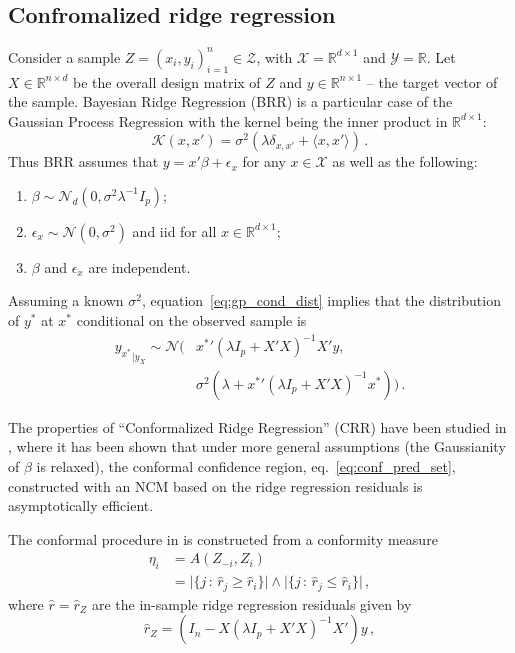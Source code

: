 \documentclass[a4paper,14pt]{extarticle}
\newcommand{\Ncal}{\mathcal{N}}
\newcommand{\Kcal}{\mathcal{K}}
\newcommand{\Xcal}{\mathcal{X}}
\newcommand{\Ycal}{\mathcal{Y}}
\newcommand{\Zcal}{\mathcal{Z}}
\newcommand{\Real}{\mathbb{R}}
\begin{document}
\subsection{Confromalized ridge regression} %
\label{sub:conformalized_ridge_regression}

Consider a sample $Z = (x_i, y_i)_{i=1}^n \in \Zcal$, with $\Xcal = \Real^{d\times 1}$
and $\Ycal=\Real$. Let $X\in\Real^{n\times d}$ be the overall design matrix of $Z$
and $y\in\Real^{n\times1}$ -- the target vector of the sample. Bayesian Ridge Regression
(BRR) is a particular case of the Gaussian Process Regression with the kernel being
the inner product in $\Real^{d\times1}$:
\begin{equation*}
  \Kcal(x,x') = \sigma^2(\lambda \delta_{x,x'} + \langle x,x'\rangle) \,.
\end{equation*}
Thus BRR assumes that $y = x'\beta + \epsilon_x$ for any $x\in\Xcal$ as well as
the following:
\begin{enumerate}
  \item $\beta\sim\Ncal_d(0, \sigma^2 \lambda^{-1} I_p)$;
  \item $\epsilon_x\sim \Ncal(0, \sigma^2)$ and iid for all $x\in \Real^{d\times 1}$;
  \item $\beta$ and $\epsilon_x$ are independent.
\end{enumerate}
Assuming a known $\sigma^2$, equation~\ref{eq:gp_cond_dist} implies that the distribution
of $y^*$ at $x^*$ conditional on the observed sample is
\begin{align} \label{eq:brr_cond_dist}
  {y_{x^*}}_{|y_X}
    \sim \Ncal\bigl(&{x^*}'(\lambda I_p + X'X)^{-1}X'y, \nonumber\\
      &\sigma^2 (\lambda + {x^*}' (\lambda I_p + X'X)^{-1} x^* ) \bigr)
    \,.
\end{align}

The properties of ``Conformalized Ridge Regression'' (CRR) have been studied in \cite{burnaevV14},
where it has been shown that under more general assumptions (the Gaussianity of $\beta$
is relaxed), the conformal confidence region, eq.~\ref{eq:conf_pred_set}, constructed
with an NCM based on the ridge regression residuals is asymptotically efficient.

The conformal procedure in \cite{burnaevV14} is constructed from a conformity measure
\begin{align} \label{eq:crr_ncm}
  \eta_i &= A(Z_{-i}, Z_i) \nonumber \\
    &= \bigl\lvert\{j\,:\, \hat{r}_j \geq \hat{r}_i \} \bigr\rvert \wedge
       \bigl\lvert\{j\,:\, \hat{r}_j \leq \hat{r}_i \} \bigr\rvert \,,
\end{align}
where $\hat{r} = \hat{r}_Z$ are the in-sample ridge regression residuals given by
\begin{equation} \label{eq:rr_insample_resid}
  \hat{r}_Z = (I_n - X (\lambda I_p + X'X)^{-1} X') y \,,
\end{equation}
\end{document}
